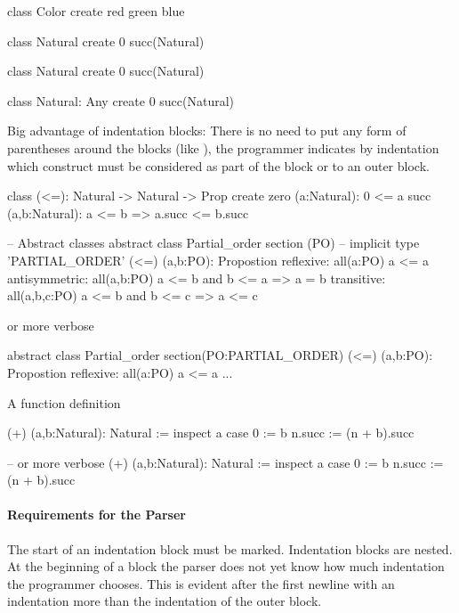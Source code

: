 \begin{alba}
  class Color create red green blue

  class Natural create 0 succ(Natural)

  class Natural create
    0
    succ(Natural)

  class
    Natural: Any
  create
    0
    succ(Natural)
\end{alba}


Big advantage of indentation blocks: There is no need to put any form of
parentheses around the blocks (like ), the programmer
indicates by indentation which construct must be considered as part of the
block or to an outer block.


\begin{alba}
  class
    (<=): Natural -> Natural -> Prop
  create
    zero (a:Natural): 0 <= a
    succ (a,b:Natural): a <= b  =>  a.succ <= b.succ
\end{alba}



\begin{alba}
  -- Abstract classes
  abstract class Partial_order section (PO)  -- implicit type 'PARTIAL_ORDER'
    (<=) (a,b:PO): Propostion
    reflexive: all(a:PO)
      a <= a
    antisymmetric: all(a,b:PO)
      a <= b  and  b <= a
      =>  a = b
    transitive: all(a,b,c:PO)
      a <= b and b <= c
      => a <= c
\end{alba}
%
or more verbose
\begin{alba}
  abstract class
    Partial_order
  section(PO:PARTIAL_ORDER)
    (<=) (a,b:PO): Propostion
    reflexive: all(a:PO)
      a <= a
    ...
\end{alba}

A function definition
\begin{alba}
  (+) (a,b:Natural): Natural :=
    inspect a case
      0 := b
      n.succ :=
        (n + b).succ

  -- or more verbose
  (+) (a,b:Natural): Natural :=
    inspect
      a
    case
      0 := b
      n.succ :=
        (n + b).succ
\end{alba}


\paragraph{Requirements for the Parser}
The start of an indentation block must be marked. Indentation blocks are
nested. At the beginning of a block the parser does not yet know how much
indentation the programmer chooses. This is evident after the first newline
with an indentation more than the indentation of the outer block.

